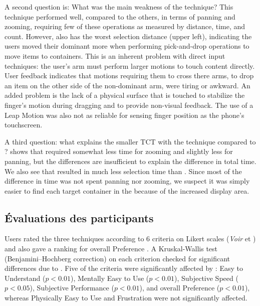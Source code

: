 
A second question is: What was the main weakness of the  technique? This technique performed well, compared to the others, in terms of panning and zooming, requiring few of these operations as measured by distance, time, and count. However,  also has the worst selection distance  (upper left), indicating the users moved their dominant more when performing pick-and-drop operations to move items to containers. This is an inherent problem with direct input techniques: the user's arm must perform larger motions to touch content directly. User feedback indicates that motions requiring them to cross there arms, to drop an item on the other side of the non-dominant arm, were tiring or awkward. An added problem is the lack of a physical surface that is touched to stabilize the finger's motion during dragging and to provide non-visual feedback. The use of a Leap Motion was also not as reliable for sensing finger position as the phone's touchscreen.

A third question: what explains the smaller TCT with the  technique compared to ?  shows that  required somewhat less time for zooming and slightly less for panning, but the differences are insufficient to explain the difference in total time. We also see that  resulted in much less selection time than . Since most of the difference in time was not spent panning nor zooming, we suspect it was simply easier to find each target container in the  because of the increased display area.

\subsection{Évaluations des participants}
\label{subsec:experiment_results_evaluations}
Users rated the three techniques according to 6 criteria on Likert scales (\textit{Voir}  et ) and also gave a ranking for overall Preference . A Kruskal-Wallis test (Benjamini–Hochberg correction) on each criterion checked for significant differences due to . Five of the criteria were significantly affected by : Easy to Understand ($p<0.01$), Mentally Easy to Use ($p<0.01$), Subjective Speed ($p<0.05$), Subjective Performance ($p<0.01$), and overall Preference ($p<0.01$), whereas Physically Easy to Use and Frustration were not significantly affected.

